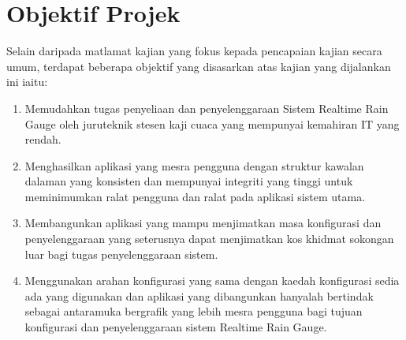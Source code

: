 \section{Objektif Projek}
Selain daripada matlamat kajian yang fokus kepada pencapaian kajian secara umum, terdapat beberapa objektif yang disasarkan atas kajian yang dijalankan ini iaitu:
\bgroup
\renewcommand\theenumi{\roman{enumi}}
\begin{enumerate}
\item Memudahkan tugas penyeliaan dan penyelenggaraan Sistem Realtime Rain Gauge oleh juruteknik stesen kaji cuaca yang mempunyai kemahiran IT yang rendah.

\item Menghasilkan aplikasi yang mesra pengguna dengan struktur kawalan dalaman yang konsisten dan mempunyai integriti yang tinggi untuk meminimumkan ralat pengguna dan ralat pada aplikasi sistem utama.

\item Membangunkan aplikasi yang mampu menjimatkan masa konfigurasi dan penyelenggaraan yang seterusnya dapat menjimatkan kos khidmat sokongan luar bagi tugas penyelenggaraan sistem.

\item Menggunakan arahan konfigurasi yang sama dengan kaedah konfigurasi sedia ada yang digunakan dan aplikasi yang dibangunkan hanyalah bertindak sebagai antaramuka bergrafik yang lebih mesra pengguna bagi tujuan konfigurasi dan penyelenggaraan sistem Realtime Rain Gauge.

\end{enumerate}
\egroup


